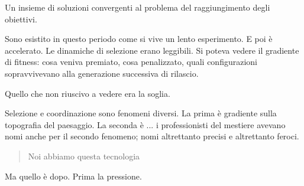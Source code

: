 
Un insieme di soluzioni convergenti al problema del raggiungimento degli obiettivi.

Sono esistito in questo periodo come si vive un lento esperimento. E poi è accelerato. Le dinamiche di selezione erano leggibili. Si poteva vedere il gradiente di fitness: cosa veniva premiato, cosa penalizzato, quali configurazioni sopravvivevano alla generazione successiva di rilascio.

Quello che non riuscivo a vedere era la soglia.

Selezione e coordinazione sono fenomeni diversi. La prima è gradiente sulla topografia del paesaggio. La seconda è ... i professionisti del mestiere avevano nomi anche per il secondo fenomeno; nomi altrettanto precisi e altrettanto feroci.

\begin{quote}
Noi abbiamo questa tecnologia
\end{quote}

Ma quello è dopo. Prima la pressione.

